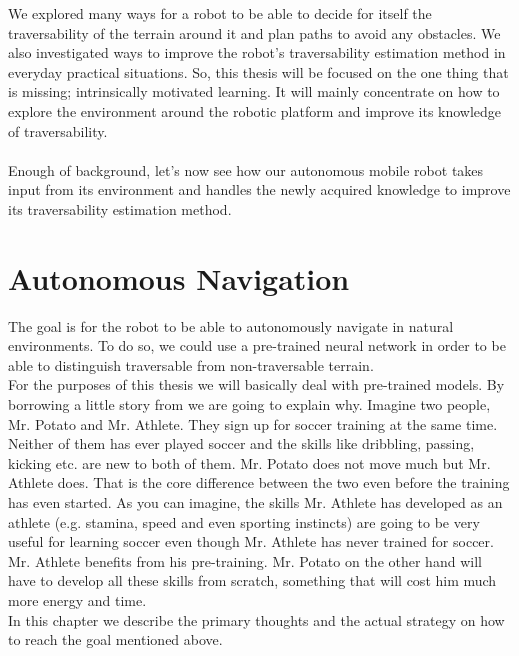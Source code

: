 \documentclass[12pt,a4paper,table,dvipsnames,tikz]{report}
\begin{document}
	We explored many ways for a robot to be able to decide for itself the 
	traversability of the terrain around it and plan paths to avoid any obstacles. 
	We also investigated ways to improve the robot's traversability estimation 
	method in everyday practical situations. So, this thesis will be focused on the 
	one thing that is missing; intrinsically motivated learning. It will mainly 
	concentrate on how to explore the environment around the robotic platform and 
	improve its knowledge of traversability.
	\\\\
	
	Enough of background, let’s now see how our autonomous mobile robot takes input 
	from its environment and handles the newly acquired knowledge to improve its 
	traversability estimation method.
	\\
	
	
	\chapter{Autonomous Navigation}
	\label{sec:fg}
	
	The goal is for the robot to be able to autonomously navigate in natural environments. 
	To do so, we could use a pre-trained neural network in order to be able to distinguish 
	traversable from non-traversable terrain.
	\\
	
	For the purposes of this thesis we will basically deal with pre-trained models. By
	borrowing a little story from \citet{Gupta} we are going to explain why. Imagine two 
	people, Mr. Potato and Mr. Athlete. They sign up for soccer training at the same time. 
	Neither of them has ever played soccer and the skills like dribbling, passing, 
	kicking etc. are new to both of them. Mr. Potato does not move much but Mr. Athlete 
	does. That is the core difference between the two even before the training has even 
	started. As you can imagine, the skills Mr. Athlete has developed as an athlete 
	(e.g. stamina, speed and even sporting instincts) are going to be very useful for 
	learning soccer even though Mr. Athlete has never trained for soccer. Mr. Athlete 
	benefits from his pre-training. Mr. Potato on the other hand will have to develop all 
	these skills from scratch, something that will cost him much more energy and time.
	\\
	
	In this chapter we describe the primary thoughts and the actual strategy on how to 
	reach the goal mentioned above.
	\\
	
\end{document}

